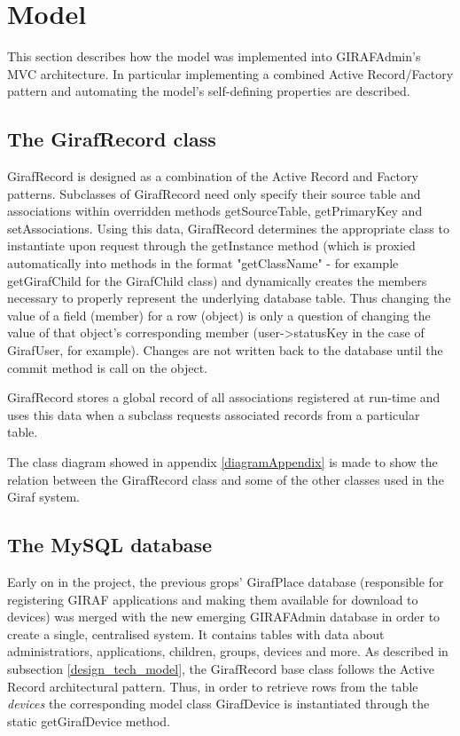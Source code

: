 \section{Model}
\label{model}
This section describes how the model was implemented into GIRAFAdmin's MVC architecture. In particular implementing a combined Active Record/Factory pattern and automating the model's self-defining properties are described.

\subsection{The GirafRecord class}
GirafRecord is designed as a combination of the Active Record and Factory patterns. Subclasses of GirafRecord need only specify their source table and associations within overridden methods getSourceTable, getPrimaryKey and setAssociations. Using this data, GirafRecord determines the appropriate class to instantiate upon request through the getInstance method (which is proxied automatically into methods in the format "getClassName" - for example getGirafChild for the GirafChild class) and dynamically creates the members necessary to properly represent the underlying database table. Thus changing the value of a field (member) for a row (object) is only a question of changing the value of that object's corresponding member (user->statusKey in the case of GirafUser, for example). Changes are not written back to the database until the commit method is call on the object.

GirafRecord stores a global record of all associations registered at run-time and uses this data when a subclass requests associated records from a particular table.

The class diagram showed in appendix \ref{diagramAppendix} is made to show the relation between the GirafRecord class and some of the other classes used in the Giraf system.

\subsection{The MySQL database}
Early on in the project, the previous grops' GirafPlace database (responsible for registering GIRAF applications and making them available for download to devices) was merged with the new emerging GIRAFAdmin database in order to create a single, centralised system. It contains tables with data about administratiors, applications, children, groups, devices and more.
As described in subsection \vref{design_tech_model}, the GirafRecord base class follows the Active Record architectural pattern. Thus, in order to retrieve rows from the table \emph{devices} the corresponding model class GirafDevice is instantiated through the static getGirafDevice method.

